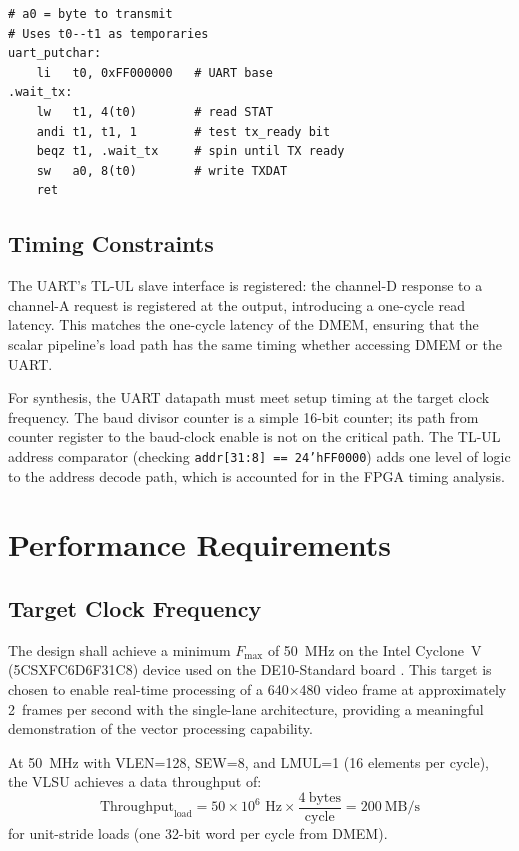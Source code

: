 \begin{lstlisting}[language=RISCV, caption={UART transmit byte (polling)}]
# a0 = byte to transmit
# Uses t0--t1 as temporaries
uart_putchar:
    li   t0, 0xFF000000   # UART base
.wait_tx:
    lw   t1, 4(t0)        # read STAT
    andi t1, t1, 1        # test tx_ready bit
    beqz t1, .wait_tx     # spin until TX ready
    sw   a0, 8(t0)        # write TXDAT
    ret
\end{lstlisting}

\subsection{Timing Constraints}

The UART's TL-UL slave interface is registered: the channel-D response to a channel-A
request is registered at the output, introducing a one-cycle read latency. This matches
the one-cycle latency of the DMEM, ensuring that the scalar pipeline's load path has
the same timing whether accessing DMEM or the UART.

For synthesis, the UART datapath must meet setup timing at the target clock frequency.
The baud divisor counter is a simple 16-bit counter; its path from counter register
to the baud-clock enable is not on the critical path. The TL-UL address comparator
(checking \texttt{addr[31:8] == 24'hFF0000}) adds one level of logic to the address
decode path, which is accounted for in the FPGA timing analysis.

\section{Performance Requirements}
\label{sec:perf-requirements}

\subsection{Target Clock Frequency}

The design shall achieve a minimum $F_\text{max}$ of 50~MHz on the Intel Cyclone~V
(5CSXFC6D6F31C8) device used on the DE10-Standard board \cite{de10standard}. This
target is chosen to enable real-time processing of a 640$\times$480 video frame
at approximately 2~frames per second with the single-lane architecture, providing
a meaningful demonstration of the vector processing capability.

At 50~MHz with VLEN=128, SEW=8, and LMUL=1 (16 elements per cycle), the VLSU achieves
a data throughput of:
\begin{equation}
  \text{Throughput}_\text{load} = 50 \times 10^6 \text{ Hz} \times \frac{4~\text{bytes}}{\text{cycle}} = 200~\text{MB/s}
  \label{eq:load-throughput}
\end{equation}
for unit-stride loads (one 32-bit word per cycle from DMEM).

